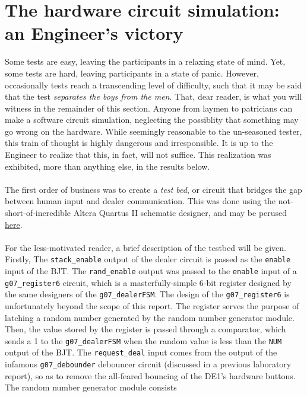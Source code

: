 \documentclass[12pt]{report}
\begin{document}
\section*{The hardware circuit simulation: an Engineer's victory}
Some tests are easy, leaving the participants in a relaxing state of mind. Yet, some tests are hard,
leaving participants in a state of panic. However, occasionally tests reach a transcending level of
difficulty, such that it may be said that the test \textit{separates the boys from the men}. That,
dear reader, is what you will witness in the remainder of this section. Anyone from laymen to
patricians can make a software circuit simulation, neglecting the possiblity that something may go
wrong on the hardware. While seemingly reasonable to the un-seasoned tester, this train of thought
is highly dangerous and irresponsible. It is up to the Engineer to realize that this, in fact, will
not suffice. This realization was exhibited, more than anything else, in the results below. \\\\
The first order of business was to create a \textit{test bed}, or circuit that bridges the gap
between human input and dealer communication. This was done using the not-short-of-incredible Altera
Quartus II schematic designer, and may be perused \hyperref[a:testbed]{here}.\\\\
For the less-motivated reader, a brief description of the testbed will be given. Firstly, The
\texttt{stack\_enable} output of the dealer circuit is passed as the \texttt{enable} input of the
BJT. The \texttt{rand\_enable} output was passed to the \texttt{enable} input of a
\texttt{g07\_register6} circuit, which is a masterfully-simple 6-bit register designed by the same
designers of the \texttt{g07\_dealerFSM}. The design of the \texttt{g07\_register6} is unfortunately
beyond the scope of this report. The register serves the purpose of latching a random
number generated by the random number generator module. Then, the value stored by the register is
passed through a comparator, which sends a 1 to the \texttt{g07\_dealerFSM} when the random value is
less than the \texttt{NUM} output of the BJT. The \texttt{request\_deal} input comes from the output
of the infamous \texttt{g07\_debounder} debouncer circuit (discussed in a previous laboratory
report), so as to remove the all-feared bouncing of the DE1's hardware buttons. The random number
generator module consists
\end{document}
